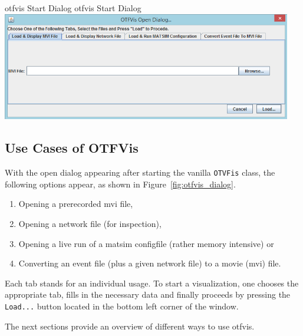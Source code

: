 \createfigure%
{\gls{otfvis} Start Dialog}%
{\gls{otfvis} Start Dialog}%
{\label{fig:otfvis_dialog}}%
{\includegraphics[width=0.95\textwidth, angle=0]{extending/figures/otfvis/image03.png}}%
{}

\subsection{Use Cases of OTFVis}
With the open dialog appearing after starting the vanilla \lstinline|OTVFis| class, the following options appear, as shown in Figure~\ref{fig:otfvis_dialog}.
%
\begin{enumerate}\styleEnumerate
	\item Opening a prerecorded \gls{mvi} file,
	\item Opening a network file (for inspection),
	\item Opening a live run of a \gls{matsim} \gls{configfile} (rather memory intensive) or
	\item Converting an event file (plus a given network file) to a movie (\gls{mvi}) file.
\end{enumerate}

Each tab stands for an individual usage. To start a visualization, one chooses the appropriate tab, fills in the necessary data and finally proceeds by pressing the \lstinline|Load...| button located in the bottom left corner of the window.

The next sections provide an overview of different ways to use \gls{otfvis}.

